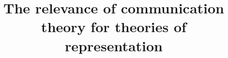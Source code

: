



\title{The relevance of communication theory for theories of representation}
\date{\vspace{-10ex}}


\usepackage{fontenc}
\usepackage{graphicx}
\usepackage{kpfonts,baskervald}
\graphicspath{{img/}}

\usepackage[
	a4paper,
	total={6in, 8in}
]{geometry}
\renewcommand{\baselinestretch}{1.5} %
\setlength{\voffset}{-0.75in} %
\setlength{\textheight}{700pt}
\setlength{\marginparwidth}{0pt}

\usepackage{mathptmx}
\usepackage{mathtools} %
\usepackage{amsmath}
\usepackage{hyperref}

\usepackage{makecell} %
\renewcommand{\cellalign}{cl} %



\usepackage{doi}
\usepackage[style=authoryear-comp,
		backend=bibtex,
		isbn=false,
		natbib=true,
    uniquelist=false, %
    maxcitenames=2] %
		{biblatex}





